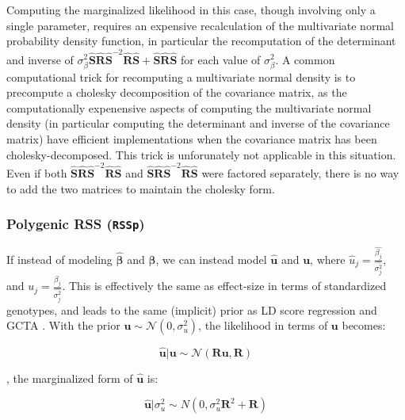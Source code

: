 Computing the marginalized likelihood in this case, though involving only a single parameter, requires an expensive recalculation of the multivariate normal probability density function, in particular 
the recomputation of the determinant and inverse of \(\sigma_\beta^2\hat{\textbf{S}}\hat{\textbf{R}}\hat{\textbf{S}}^{-2}\hat{\textbf{R}}\hat{\textbf{S}}+\hat{\textbf{S}}\hat{\textbf{R}}\hat{\textbf{S}}\) for each value of 
\(\sigma_\beta^2\).  A common computational trick for recomputing a multivariate normal density is to precompute a cholesky decomposition of the covariance matrix, as the computationally expenensive aspects of computing the multivariate normal density (in particular computing the determinant and inverse of the covariance matrix) have efficient implementations when the covariance matrix has been cholesky-decomposed.  This trick is unforunately not applicable in this situation.  Even if both $\hat{\textbf{S}}\hat{\textbf{R}}\hat{\textbf{S}}^{-2}\hat{\textbf{R}}\hat{\textbf{S}}$ and $\hat{\textbf{S}}\hat{\textbf{R}}\hat{\textbf{S}}^{-2}\hat{\textbf{R}}\hat{\textbf{S}}$ were factored separately, there is no way to add the two matrices to maintain the cholesky form.


\subsubsection{Polygenic RSS (\texttt{RSSp})}\label{sec:org040cb73}

If instead of modeling \(\hat{\boldsymbol{\beta}}\) and \(\boldsymbol{\beta}\), we can instead model $\hat{\textbf{u}}$ and $\textbf{u}$, where $\hat{u}_j=\frac{\hat{\beta_j}}{\hat{\sigma_j^2}}$, and  \(u_j=\frac{\beta_j}{\hat{\sigma_j^2}}\).  This is effectively the same as effect-size in terms of standardized genotypes, and leads to the same (implicit) prior as LD score regression \cite{ldsc} and GCTA \cite{GCTA}.  With the prior $\textbf{u} \sim \mathcal{N}(0,\sigma_u^2)$, the likelihood in terms of $\textbf{u}$ becomes:

$$\hat{\textbf{u}} | \textbf{u} \sim \mathcal{N}(\textbf{R} \textbf{u},\textbf{R})$$

, the marginalized form of $\hat{\textbf{u}}$ is:

\[ \hat{\textbf{u}}|\sigma_u^2 \sim N(0,\sigma_u^2\textbf{R}^2+\textbf{R})\]

